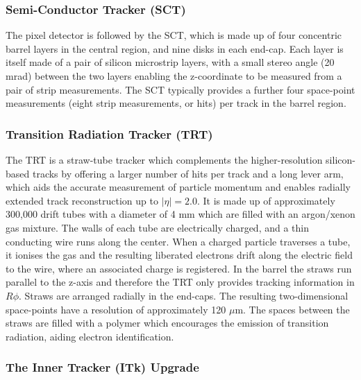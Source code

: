 \subsubsection{Semi-Conductor Tracker (SCT)}

The pixel detector is followed by the SCT, which is made up of four concentric barrel layers in the central region, and nine disks in each end-cap. Each layer is itself made of a pair of silicon microstrip layers, with a small stereo angle (20 mrad) between the two layers enabling the z-coordinate to be measured from a pair of strip measurements. The SCT typically provides a further four space-point measurements (eight strip measurements, or hits) per track in the barrel region.


\subsubsection{Transition Radiation Tracker (TRT)}

The TRT is a straw-tube tracker which complements the higher-resolution silicon- based tracks by offering a larger number of hits per track and a long lever arm, which aids the accurate measurement of particle momentum and enables radially extended track reconstruction up to $ \lvert \eta \rvert = 2.0$. It is made up of approximately 300,000 drift tubes with a diameter of 4 mm which are filled with an argon/xenon gas mixture. The walls of each tube are electrically charged, and a thin conducting wire runs along the center. When a charged particle traverses a tube, it ionises the gas and the resulting liberated electrons drift along the electric field to the wire, where an associated charge is registered. In the barrel the straws run parallel to the z-axis and therefore the TRT only provides tracking information in $R\phi$. Straws are arranged radially in the end-caps. The resulting two-dimensional space-points have a resolution of approximately 120 $\mu$m. The spaces between the straws are filled with a polymer which encourages the emission of transition radiation, aiding electron identification.

\subsubsection{The Inner Tracker (ITk) Upgrade}

